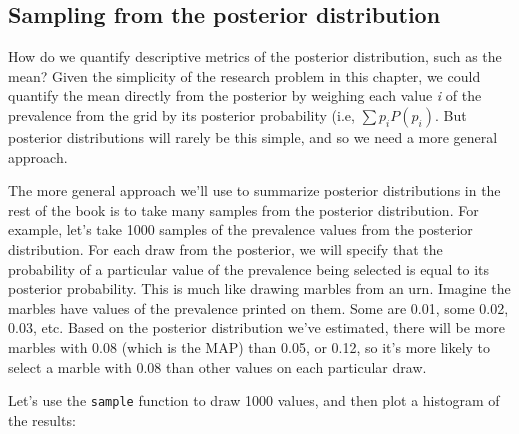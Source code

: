 \documentclass[
]{book}
\begin{document}
\subsection{Sampling from the posterior distribution}\label{sampling-from-the-posterior-distribution}

How do we quantify descriptive metrics of the posterior distribution, such as the mean? Given the simplicity of the research problem in this chapter, we could quantify the mean directly from the posterior by weighing each value \emph{i} of the prevalence from the grid by its posterior probability (i.e, \(\sum p_{i}P(p_{i})\). But posterior distributions will rarely be this simple, and so we need a more general approach.

The more general approach we'll use to summarize posterior distributions in the rest of the book is to take many samples from the posterior distribution. For example, let's take 1000 samples of the prevalence values from the posterior distribution. For each draw from the posterior, we will specify that the probability of a particular value of the prevalence being selected is equal to its posterior probability. This is much like drawing marbles from an urn. Imagine the marbles have values of the prevalence printed on them. Some are 0.01, some 0.02, 0.03, etc. Based on the posterior distribution we've estimated, there will be more marbles with 0.08 (which is the MAP) than 0.05, or 0.12, so it's more likely to select a marble with 0.08 than other values on each particular draw.

Let's use the \texttt{sample} function to draw 1000 values, and then plot a histogram of the results:
\end{document}
